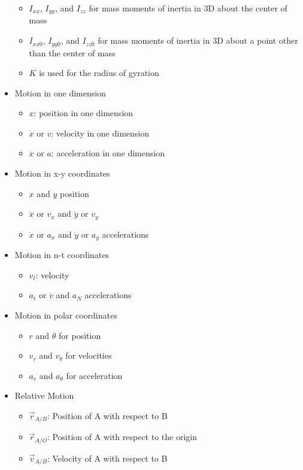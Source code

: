 \documentclass[a4paper]{article}
\begin{document}
\begin{itemize}
\begin{itemize}
			\item \(I_{xx}\), \(I_{yy}\), and \(I_{zz}\) for mass moments of inertia in 3D about the center of mass
			\item \(I_{xx0}\), \(I_{yy0}\), and \(I_{zz0}\) for mass moments of inertia in 3D about a point other than the center of mass
			\item \(K\) is used for the radius of gyration
		\end{itemize}
	\item Motion in one dimension
		\begin{itemize}
			\item \(x\): position in one dimension
			\item \(\dot{x}\) or \(v\): velocity in one dimension
			\item \(\ddot{x}\) or \(a\): acceleration in one dimension
		\end{itemize}
	\item Motion in x-y coordinates
		\begin{itemize}
			\item \(x\) and \(y\) position
			\item \(\dot{x}\) or \(v_x\) and \(\dot{y}\) or \(v_y\)
			\item \(\ddot{x}\) or \(a_x\) and \(\ddot{y}\) or \(a_y\) accelerations
		\end{itemize}
	\item Motion in n-t coordinates
		\begin{itemize}
			\item \(v_t\): velocity
			\item \(a_t\) or \(\dot{v}\) and \(a_N\) accelerations
		\end{itemize}
	\item Motion in polar coordinates
		\begin{itemize}
			\item \(r\) and \(\theta\) for position
			\item \(v_r\) and \(v_\theta\) for velocities
			\item \(a_r\) and \(a_\theta\) for acceleration
		\end{itemize}
	\item Relative Motion
		\begin{itemize}
			\item \(\vec{r}_{A/B}\): Position of A with respect to B
			\item \(\vec{r}_{A/O}\): Position of A with respect to the origin
			\item \(\vec{v}_{A/B}\): Velocity of A with respect to B

\end{itemize}
\end{itemize}
\end{document}
